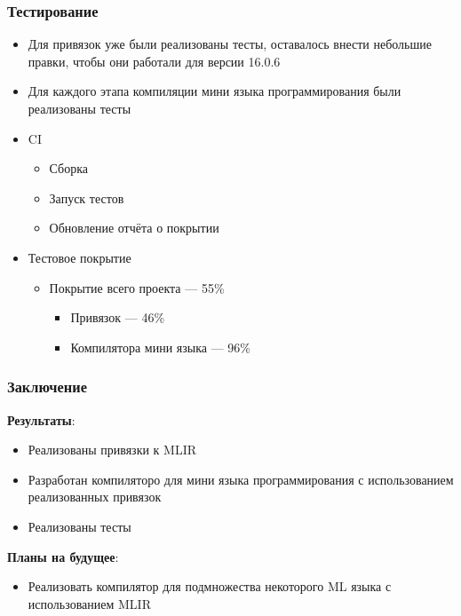 \documentclass{beamer}
\begin{document}
\begin{frame}
	\frametitle{Тестирование}
	\begin{itemize}
		\item Для привязок уже были реализованы тесты, оставалось внести небольшие правки, чтобы они работали для версии 16.0.6
		\item Для каждого этапа компиляции мини языка программирования были реализованы тесты
		\item CI
		      \begin{itemize}
			      \item Сборка
			      \item Запуск тестов
			      \item Обновление отчёта о покрытии
		      \end{itemize}

		\item Тестовое покрытие
		      \begin{itemize}
			      \item Покрытие всего проекта --- 55\%
			            \begin{itemize}
				            \item Привязок --- 46\%
				            \item Компилятора мини языка --- 96\%
			            \end{itemize}
		      \end{itemize}
	\end{itemize}

\end{frame}

\begin{frame}
	\frametitle{Заключение}
	\textbf{Результаты}:
	\begin{itemize}
		\item Реализованы привязки к MLIR
		\item Разработан компиляторо для мини языка программирования с использованием реализованных привязок
		\item Реализованы тесты
	\end{itemize}

	\textbf{Планы на будущее}:
	\begin{itemize}
		\item Реализовать компилятор для подмножества некоторого ML языка с использованием MLIR
	\end{itemize}


\end{frame}
\end{document}
